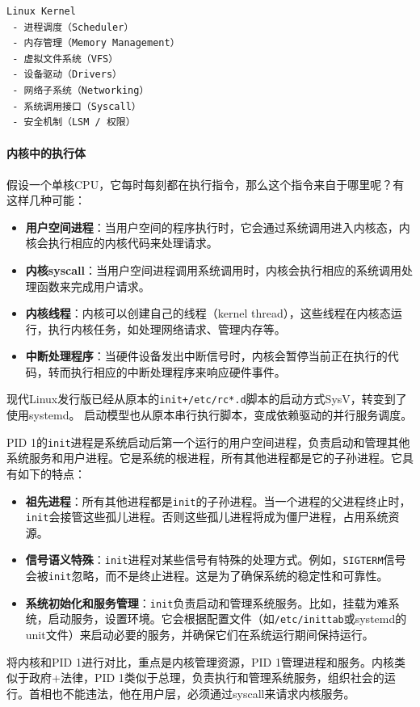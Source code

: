 \begin{lstlisting}[language=bash, caption={Linux内核的核心子系统}]
Linux Kernel
 - 进程调度（Scheduler）
 - 内存管理（Memory Management）
 - 虚拟文件系统（VFS）
 - 设备驱动（Drivers）
 - 网络子系统（Networking）
 - 系统调用接口（Syscall）
 - 安全机制（LSM / 权限）
\end{lstlisting}

\paragraph{内核中的执行体}
假设一个单核CPU，它每时每刻都在执行指令，那么这个指令来自于哪里呢？有这样几种可能：
\begin{itemize}
    \item \textbf{用户空间进程}：当用户空间的程序执行时，它会通过系统调用进入内核态，内核会执行相应的内核代码来处理请求。
    \item \textbf{内核syscall}：当用户空间进程调用系统调用时，内核会执行相应的系统调用处理函数来完成用户请求。
    \item \textbf{内核线程}：内核可以创建自己的线程（kernel thread），这些线程在内核态运行，执行内核任务，如处理网络请求、管理内存等。
    \item \textbf{中断处理程序}：当硬件设备发出中断信号时，内核会暂停当前正在执行的代码，转而执行相应的中断处理程序来响应硬件事件。
\end{itemize}


现代Linux发行版已经从原本的\texttt{init+/etc/rc*.d}脚本的启动方式SysV，转变到了使用systemd。
启动模型也从原本串行执行脚本，变成依赖驱动的并行服务调度。

PID 1的\texttt{init}进程是系统启动后第一个运行的用户空间进程，负责启动和管理其他系统服务和用户进程。它是系统的根进程，所有其他进程都是它的子孙进程。它具有如下的特点：
\begin{itemize}
    \item \textbf{祖先进程}：所有其他进程都是\texttt{init}的子孙进程。当一个进程的父进程终止时，\texttt{init}会接管这些孤儿进程。否则这些孤儿进程将成为僵尸进程，占用系统资源。
    \item \textbf{信号语义特殊}：\texttt{init}进程对某些信号有特殊的处理方式。例如，\texttt{SIGTERM}信号会被\texttt{init}忽略，而不是终止进程。这是为了确保系统的稳定性和可靠性。
    \item \textbf{系统初始化和服务管理}：\texttt{init}负责启动和管理系统服务。比如，挂载为难系统，启动服务，设置环境。它会根据配置文件（如\texttt{/etc/inittab}或systemd的unit文件）来启动必要的服务，并确保它们在系统运行期间保持运行。
\end{itemize}

将内核和PID 1进行对比，重点是内核管理资源，PID 1管理进程和服务。内核类似于政府+法律，PID 1类似于总理，负责执行和管理系统服务，组织社会的运行。首相也不能违法，他在用户层，必须通过syscall来请求内核服务。